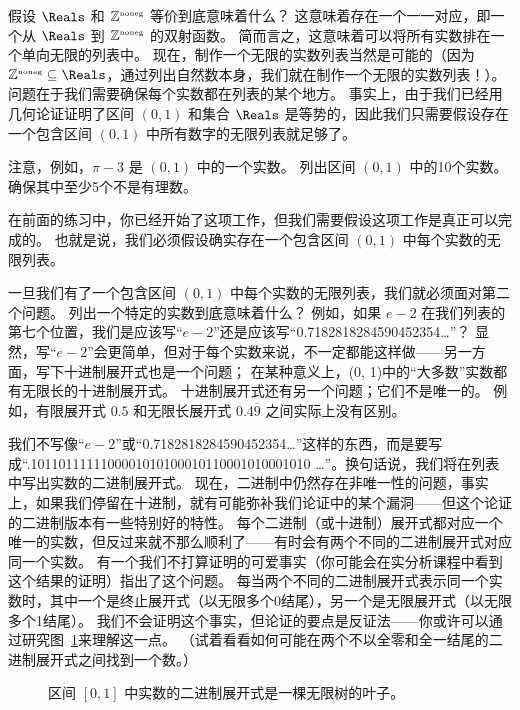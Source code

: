 假设 $\Reals$ 和 ${\mathbb Z}^{\mbox{\tiny noneg}}$ 等价到底意味着什么？
这意味着存在一个一一对应，即一个从 $\Reals$ 到 ${\mathbb Z}^{\mbox{\tiny noneg}}$ 的双射函数。
简而言之，这意味着可以将所有实数排在一个单向无限的列表中。
现在，制作一个无限的实数列表当然是可能的（因为 $\Naturals \subseteq \Reals$，通过列出自然数本身，我们就在制作一个无限的实数列表！）。
问题在于我们需要确保每个实数都在列表的某个地方。
事实上，由于我们已经用几何论证证明了区间 $(0, 1)$ 和集合 $\Reals$ 是等势的，因此我们只需要假设存在一个包含区间 $(0, 1)$ 中所有数字的无限列表就足够了。

\begin{exer}  
注意，例如，$\pi-3$ 是 $(0, 1)$ 中的一个实数。
    列出区间 $(0, 1)$ 中的10个实数。
    确保其中至少5个不是有理数。
\end{exer}

在前面的练习中，你已经开始了这项工作，但我们需要假设这项工作是真正可以完成的。
也就是说，我们必须假设确实存在一个包含区间 $(0, 1)$ 中每个实数的无限列表。

一旦我们有了一个包含区间 $(0, 1)$ 中每个实数的无限列表，我们就必须面对第二个问题。
列出一个特定的实数到底意味着什么？
例如，如果 $e-2$ 在我们列表的第七个位置，我们是应该写“$e-2$”还是应该写“0.7182818284590452354\ldots”？
显然，写“$e-2$”会更简单，但对于每个实数来说，不一定都能这样做——另一方面，写下十进制展开式也是一个问题；
在某种意义上，(0, 1)中的“大多数”实数都有无限长的十进制展开式。
十进制展开式还有另一个问题；它们不是唯一的。
例如，有限展开式 $0.5$ 和无限长展开式 $0.4\overline{9}$ 之间实际上没有区别。

我们不写像“$e-2$”或“0.7182818284590452354\ldots”这样的东西，而是要写成“.1011011111100001010100010110001010001010 \ldots”。换句话说，我们将在列表中写出实数的二进制展开式。
现在，二进制中仍然存在非唯一性的问题，事实上，如果我们停留在十进制，就有可能弥补我们论证中的某个漏洞——但这个论证的二进制版本有一些特别好的特性。
每个二进制（或十进制）展开式都对应一个唯一的实数，但反过来就不那么顺利了——有时会有两个不同的二进制展开式对应同一个实数。
有一个我们不打算证明的可爱事实（你可能会在实分析课程中看到这个结果的证明）指出了这个问题。
每当两个不同的二进制展开式表示同一个实数时，其中一个是终止展开式（以无限多个0结尾），另一个是无限展开式（以无限多个1结尾）。
我们不会证明这个事实，但论证的要点是反证法——你或许可以通过研究图~\ref{fig:binary_reps}来理解这一点。
（试着看看如何可能在两个不以全零和全一结尾的二进制展开式之间找到一个数。）

\begin{figure}[!hbtp]
    
    \caption[单位区间内的二进制表示。]{区间 $[0, 1]$ 中实数的二进制展开式是一棵无限树的叶子。}
    \label{fig:binary_reps}
\end{figure}

